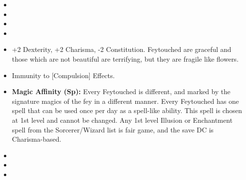 \begin{itemize}
\item {}
\item {}
\item {}
\item {}
\item +2 Dexterity, +2 Charisma, -2 Constitution. Feytouched are graceful and those which are not beautiful are terrifying, but they are fragile like flowers.
\item Immunity to [Compulsion] Effects.
\item \textbf{Magic Affinity (Sp):} Every Feytouched is different, and marked by the signature magics of the fey in a different manner. Every Feytouched has one spell that can be used once per day as a spell-like ability. This spell is chosen at 1st level and cannot be changed. Any 1st level Illusion or Enchantment spell from the Sorcerer/Wizard list is fair game, and the save DC is Charisma-based.
\item {}
\item {}
\item {}
\end{itemize}
